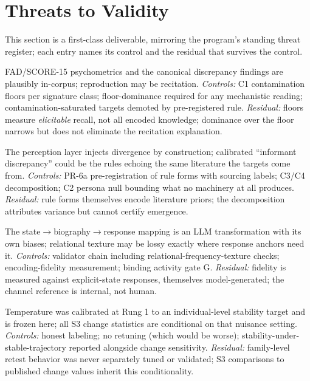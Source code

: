 \documentclass[12pt, letterpaper]{article}
\begin{document}
\section{Threats to Validity}
\label{sec:threats}

This section is a first-class deliverable, mirroring the program's standing threat register; each entry names its control and the residual that survives the control.

\begin{description}[nosep]
    \item[T1@R2 --- Training-data contamination of the benchmarks.] FAD/SCORE-15 psychometrics and the canonical discrepancy findings are plausibly in-corpus; reproduction may be recitation. \emph{Controls:} C1 contamination floors per signature class; floor-dominance required for any mechanistic reading; contamination-saturated targets demoted by pre-registered rule. \emph{Residual:} floors measure \emph{elicitable} recall, not all encoded knowledge; dominance over the floor narrows but does not eliminate the recitation explanation.
    \item[T2@R2 --- Instructed versus emergent divergence.] The perception layer injects divergence by construction; calibrated ``informant discrepancy'' could be the rules echoing the same literature the targets come from. \emph{Controls:} PR-6a pre-registration of rule forms with sourcing labels; C3/C4 decomposition; C2 persona null bounding what no machinery at all produces. \emph{Residual:} rule forms themselves encode literature priors; the decomposition attributes variance but cannot certify emergence.
    \item[T4@R2 --- Biography-channel opacity and loss.] The state$\to$biography$\to$response mapping is an LLM transformation with its own biases; relational texture may be lossy exactly where response anchors need it. \emph{Controls:} validator chain including relational-frequency-texture checks; encoding-fidelity measurement; binding activity gate G. \emph{Residual:} fidelity is measured against explicit-state responses, themselves model-generated; the channel reference is internal, not human.
    \item[T5@R2 --- Inherited nuisance calibration.] Temperature was calibrated at Rung 1 to an individual-level stability target and is frozen here; all S3 change statistics are conditional on that nuisance setting. \emph{Controls:} honest labeling; no retuning (which would be worse); stability-under-stable-trajectory reported alongside change sensitivity. \emph{Residual:} family-level retest behavior was never separately tuned or validated; S3 comparisons to published change values inherit this conditionality.

\end{description}
\end{document}
